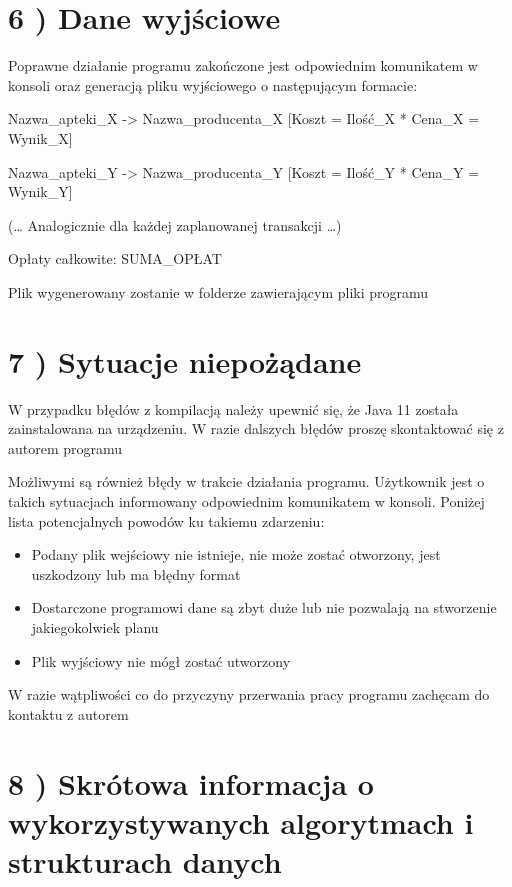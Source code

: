 \documentclass[]{article}
\begin{document}
    \section{6 ) Dane wyjściowe}

    Poprawne działanie programu zakończone jest odpowiednim komunikatem w
    konsoli oraz generacją pliku wyjściowego o następującym formacie:\linebreak

    Nazwa\_apteki\_X -\textgreater{} Nazwa\_producenta\_X {[}Koszt =
    Ilość\_X * Cena\_X = Wynik\_X{]}

    Nazwa\_apteki\_Y -\textgreater{} Nazwa\_producenta\_Y {[}Koszt =
    Ilość\_Y * Cena\_Y = Wynik\_Y{]}

    (\ldots{} Analogicznie dla każdej zaplanowanej transakcji \ldots{})

    Opłaty całkowite: SUMA\_OPŁAT\linebreak

    Plik wygenerowany zostanie w folderze zawierającym pliki programu


    \section{7 ) Sytuacje niepożądane}

    W przypadku błędów z kompilacją należy upewnić się, że Java 11 została
    zainstalowana na urządzeniu. W razie dalszych błędów proszę skontaktować
    się z autorem programu

    Możliwymi są również błędy w trakcie działania programu. Użytkownik jest
    o takich sytuacjach informowany odpowiednim komunikatem w konsoli.
    Poniżej lista potencjalnych powodów ku takiemu zdarzeniu:

    \begin{itemize}
        \item
        Podany plik wejściowy nie istnieje, nie może zostać otworzony, jest
        uszkodzony lub ma błędny format
        \item
        Dostarczone programowi dane są zbyt duże lub nie pozwalają na
        stworzenie jakiegokolwiek planu
        \item
        Plik wyjściowy nie mógł zostać utworzony
    \end{itemize}

    W razie wątpliwości co do przyczyny przerwania pracy programu zachęcam
    do kontaktu z autorem

    \section{8 ) Skrótowa informacja o wykorzystywanych algorytmach i
    strukturach danych}
\end{document}

